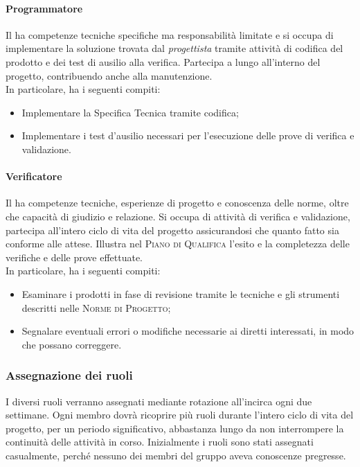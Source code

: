 \paragraph{Programmatore}

Il \emph{} ha competenze tecniche specifiche ma responsabilità limitate e si occupa di
implementare la soluzione trovata dal \emph{progettista} tramite attività di codifica del prodotto e dei test di
ausilio alla verifica. Partecipa a lungo all'interno del progetto, contribuendo anche alla manutenzione.\\
In particolare, ha i seguenti compiti:
\begin{itemize}
    \item Implementare la Specifica Tecnica tramite codifica;
    \item Implementare i test d'ausilio necessari per l'esecuzione delle prove di verifica e validazione.
\end{itemize}

\paragraph{Verificatore}

Il \emph{} ha competenze tecniche, esperienze di progetto e conoscenza delle norme, oltre che
capacità di giudizio e relazione. Si occupa di attività di verifica e validazione, partecipa all'intero ciclo di vita
del progetto assicurandosi che quanto fatto sia conforme alle attese. Illustra nel \textsc{Piano di Qualifica} l'esito
e la completezza delle verifiche e delle prove effettuate.\\
In particolare, ha i seguenti compiti:
\begin{itemize}
    \item Esaminare i prodotti in fase di revisione tramite le tecniche e gli strumenti descritti nelle \textsc{Norme di Progetto};
    \item Segnalare eventuali errori o modifiche necessarie ai diretti interessati, in modo che possano correggere.
\end{itemize}

\subsubsection{Assegnazione dei ruoli}

I diversi ruoli verranno assegnati mediante rotazione all'incirca ogni due settimane. Ogni membro
dovrà ricoprire più ruoli durante l'intero ciclo di vita del progetto, per un periodo significativo, abbastanza lungo
da non interrompere la continuità delle attività in corso. Inizialmente i ruoli sono stati assegnati casualmente,
perché nessuno dei membri del gruppo aveva conoscenze pregresse.

